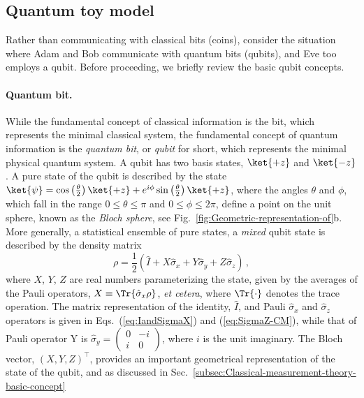 \subsection{Quantum toy model\label{subsec:Quantum-model-of}}

Rather than communicating with classical bits (coins), consider the
situation where Adam and Bob communicate with quantum bits (qubits),
and Eve too employs a qubit. Before proceeding, we briefly review
the basic qubit concepts.

\paragraph{Quantum bit. }

While the fundamental concept of classical information is the bit,
which represents the minimal classical system, the fundamental concept
of quantum information is the \emph{quantum bit}, or \emph{qubit}
for short, which represents the minimal physical quantum system. A
qubit has two basis states, $\ket{+z}$ and $\ket{-z}$. A pure state
of the qubit  is described by the state $\ket{\psi}=\cos\left(\frac{\theta}{2}\right)\ket{+z}+e^{i\phi}\sin\left(\frac{\theta}{2}\right)\ket{+z}$,
where the angles $\theta$ and $\phi$, which fall in the range $0\leq\theta\leq\pi$
and $0\leq\phi\leq2\pi$, define a point on the unit sphere, known
as the \emph{Bloch sphere}, see Fig.~\ref{fig:Geometric-representation-of}b.
 More generally, a statistical ensemble of pure states, a \emph{mixed}
qubit state is described by the density matrix 
\begin{equation}
\rho=\frac{1}{2}\left(\hat{I}+X\hat{\sigma}_{x}+Y\hat{\sigma}_{y}+Z\hat{\sigma}_{z}\right)\,,
\end{equation}
where $X$, $Y$, $Z$ are real numbers parameterizing the state,
given by the averages of the Pauli operators, $X\equiv\Tr{\hat{\sigma}_{x}\rho}$,
\emph{et cetera}, where $\Tr{\cdot}$ denotes the trace operation.
The matrix representation of the identity, $\hat{I}$, and Pauli $\hat{\sigma}_{x}$
and $\hat{\sigma}_{z}$ operators is given in Eqs.~(\ref{eq:IandSigmaX})
and (\ref{eq:SigmaZ-CM}), while that of Pauli operator Y is $\hat{\sigma}_{y}=\begin{pmatrix}0 & -i\\
i & 0
\end{pmatrix}$, where $i$ is the unit imaginary. The Bloch vector, $\left(X,Y,Z\right)^{\intercal}$,
provides an important geometrical representation of the state of the
qubit, and as discussed in Sec.~\ref{subsec:Classical-measurement-theory-basic-concept}
